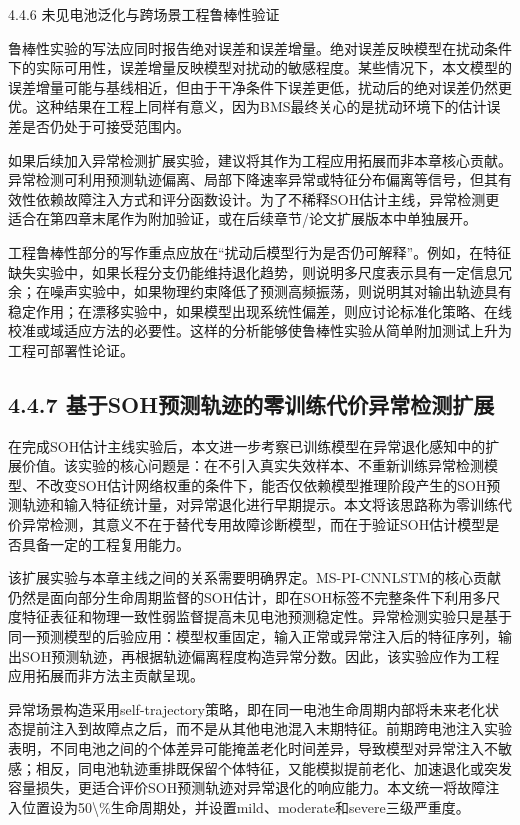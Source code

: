 \documentclass[12pt, a4paper]{ctexart}
\begin{document}
4.4.6 未见电池泛化与跨场景工程鲁棒性验证


鲁棒性实验的写法应同时报告绝对误差和误差增量。绝对误差反映模型在扰动条件下的实际可用性，误差增量反映模型对扰动的敏感程度。某些情况下，本文模型的误差增量可能与基线相近，但由于干净条件下误差更低，扰动后的绝对误差仍然更优。这种结果在工程上同样有意义，因为BMS最终关心的是扰动环境下的估计误差是否仍处于可接受范围内。


如果后续加入异常检测扩展实验，建议将其作为工程应用拓展而非本章核心贡献。异常检测可利用预测轨迹偏离、局部下降速率异常或特征分布偏离等信号，但其有效性依赖故障注入方式和评分函数设计。为了不稀释SOH估计主线，异常检测更适合在第四章末尾作为附加验证，或在后续章节/论文扩展版本中单独展开。


工程鲁棒性部分的写作重点应放在“扰动后模型行为是否仍可解释”。例如，在特征缺失实验中，如果长程分支仍能维持退化趋势，则说明多尺度表示具有一定信息冗余；在噪声实验中，如果物理约束降低了预测高频振荡，则说明其对输出轨迹具有稳定作用；在漂移实验中，如果模型出现系统性偏差，则应讨论标准化策略、在线校准或域适应方法的必要性。这样的分析能够使鲁棒性实验从简单附加测试上升为工程可部署性论证。



\subsection{4.4.7 基于SOH预测轨迹的零训练代价异常检测扩展}

在完成SOH估计主线实验后，本文进一步考察已训练模型在异常退化感知中的扩展价值。该实验的核心问题是：在不引入真实失效样本、不重新训练异常检测模型、不改变SOH估计网络权重的条件下，能否仅依赖模型推理阶段产生的SOH预测轨迹和输入特征统计量，对异常退化进行早期提示。本文将该思路称为零训练代价异常检测，其意义不在于替代专用故障诊断模型，而在于验证SOH估计模型是否具备一定的工程复用能力。


该扩展实验与本章主线之间的关系需要明确界定。MS-PI-CNNLSTM的核心贡献仍然是面向部分生命周期监督的SOH估计，即在SOH标签不完整条件下利用多尺度特征表征和物理一致性弱监督提高未见电池预测稳定性。异常检测实验只是基于同一预测模型的后验应用：模型权重固定，输入正常或异常注入后的特征序列，输出SOH预测轨迹，再根据轨迹偏离程度构造异常分数。因此，该实验应作为工程应用拓展而非方法主贡献呈现。


异常场景构造采用self-trajectory策略，即在同一电池生命周期内部将未来老化状态提前注入到故障点之后，而不是从其他电池混入末期特征。前期跨电池注入实验表明，不同电池之间的个体差异可能掩盖老化时间差异，导致模型对异常注入不敏感；相反，同电池轨迹重排既保留个体特征，又能模拟提前老化、加速退化或突发容量损失，更适合评价SOH预测轨迹对异常退化的响应能力。本文统一将故障注入位置设为50\textbackslash{}\%生命周期处，并设置mild、moderate和severe三级严重度。
\end{document}
